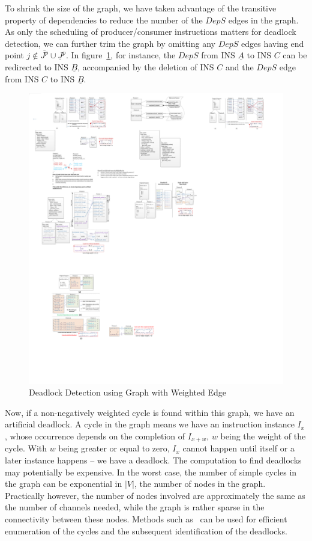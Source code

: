 To shrink the size of the graph, we have taken advantage of the transitive property of dependencies to reduce the number of the $DepS$ edges in the graph.
As only the scheduling of producer/consumer instructions matters for
deadlock detection, we can further trim the graph by omitting any $DepS$ edges having end point $j \not\in \bar{J^p} \cup \underline{J}^p$. In figure~\ref{fig:singlelevelLoopCylce}, for instance, the $DepS$ from INS $\underline{A}$ to INS $C$ can be redirected to INS $\underline{B}$, accompanied by the deletion of INS $C$ and the $DepS$ edge from INS $C$ to INS $\underline{B}$.


\begin{figure}[htp]
\begin{center}
\includegraphics[width=0.7\linewidth]{chap4fig/singlelevelLoopCycle2.pdf}
\caption{Deadlock Detection using Graph with Weighted Edge
\label{fig:singlelevelLoopCylce}}
\end{center}
\end{figure}

Now, if a non-negatively weighted cycle is found within this graph, we have an artificial deadlock.
A cycle in the graph means we have an instruction instance $I_x$, whose occurrence depends on the completion of $I_{x+w}$, $w$ being the weight of the cycle.
With $w$ being greater or equal to zero, $I_x$ cannot happen until itself or a later instance happens -- we have a deadlock. 
The computation to find deadlocks may potentially be expensive. In the worst case, the number
of simple cycles in the graph can be exponential in
$|V|$, the number of nodes in the graph. Practically however, the number of
nodes involved are approximately the same as the number of channels needed, while the graph is rather sparse in the connectivity between these nodes. 
Methods such as~\cite{doi:10.1137/0204007} can be used for efficient
enumeration of the cycles and the subsequent identification of the deadlocks.



